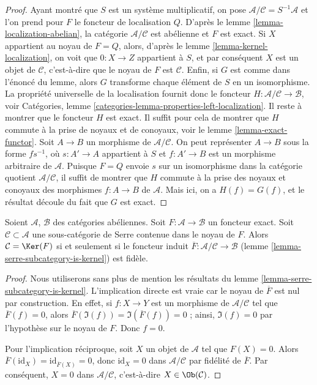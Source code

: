 \begin{proof}
\medskip\noindent
Ayant montré que $S$ est un système multiplicatif, on pose
$\mathcal{A}/\mathcal{C} = S^{-1}\mathcal{A}$ et l'on prend pour
$F$ le foncteur de localisation $Q$. D'après le
lemme \ref{lemma-localization-abelian},
la catégorie $\mathcal{A}/\mathcal{C}$ est abélienne et $F$ est exact.
Si $X$ appartient au noyau de $F = Q$, alors, d'après le
lemme \ref{lemma-kernel-localization},
on voit que $0 : X \to Z$ appartient à $S$, et par conséquent
$X$ est un objet de $\mathcal{C}$, c'est-à-dire que le noyau de
$F$ est $\mathcal{C}$.
Enfin, si $G$ est comme dans l'énoncé du lemme, alors $G$ transforme
chaque élément de $S$ en un isomorphisme. La propriété universelle de la localisation
fournit donc le foncteur $H : \mathcal{A}/\mathcal{C} \to \mathcal{B}$, voir
Catégories, lemme \ref{categories-lemma-properties-left-localization}.
Il reste à montrer que le foncteur $H$ est exact.
Il suffit pour cela de montrer que $H$ commute
à la prise de noyaux et de conoyaux, voir le lemme \ref{lemma-exact-functor}.
Soit $A \to B$ un morphisme de $\mathcal{A}/\mathcal{C}$.
On peut représenter $A \to B$ sous la forme $fs^{-1}$, où $s : A' \to A$
appartient à $S$ et $f : A' \to B$ est un morphisme arbitraire de $\mathcal{A}$.
Puisque $F = Q$ envoie $s$ sur un isomorphisme dans la catégorie quotient
$\mathcal{A}/\mathcal{C}$, il suffit de montrer que $H$ commute à la prise des
noyaux et conoyaux des morphismes $f : A \to B$ de $\mathcal{A}$.
Mais ici, on a $H(f) = G(f)$, et le résultat découle
du fait que $G$ est exact.
\end{proof}

\begin{lemma}
\label{lemma-quotient-by-kernel-exact-functor}
Soient $\mathcal{A}$, $\mathcal{B}$ des catégories abéliennes.
Soit $F : \mathcal{A} \to \mathcal{B}$ un foncteur exact.
Soit $\mathcal{C} \subset \mathcal{A}$ une sous-catégorie de Serre
contenue dans le noyau de $F$.
Alors $\mathcal{C} = \Ker(F)$ si et seulement si le foncteur induit
$\overline{F} : \mathcal{A}/\mathcal{C} \to \mathcal{B}$
(lemme \ref{lemma-serre-subcategory-is-kernel}) est fidèle.
\end{lemma}

\begin{proof}
Nous utiliserons sans plus de mention les résultats du lemme
\ref{lemma-serre-subcategory-is-kernel}.
L'implication directe est vraie car le noyau de $\overline{F}$ est nul
par construction. En effet, si $f : X \to Y$ est un morphisme de
$\mathcal{A}/\mathcal{C}$ tel que $\overline{F}(f) = 0$, alors
$\overline{F}(\Im(f)) = \Im(\overline{F}(f)) = 0$ ; ainsi, $\Im(f) = 0$ par
l'hypothèse sur le noyau de $F$. Donc $f = 0$.

\medskip\noindent
Pour l'implication réciproque, soit $X$ un objet de $\mathcal{A}$ tel que $F(X)
= 0$. Alors $\overline{F}(\text{id}_X) = \text{id}_{\overline{F}(X)} = 0$, donc
$\text{id}_X = 0$ dans $\mathcal{A}/\mathcal{C}$ par fidélité de
$\overline{F}$. Par conséquent, $X = 0$ dans $\mathcal{A}/\mathcal{C}$, c'est-à-dire $X \in
\Ob(\mathcal{C})$.
\end{proof}






